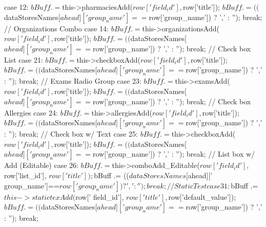 \begin{DoxyCode}
{{{{{{{                                case 12:
                                        $bBuff .= $this->pharmaciesAdd($row['
      field_id'], $row['title']);
                                        $bBuff .= (($dataStoresNames[$ahead]['
      group_name']==$row['group_name']) ? ',' : '');
                                break;
                                // Organizations Combo
                                case 14:
                                        $bBuff .= $this->organizationsAdd($row[
      'field_id'], $row['title']);
                                        $bBuff .= (($dataStoresNames[$ahead]['
      group_name']==$row['group_name']) ? ',' : '');
                                break;
                                // Check box List
                                case 21:
                                        $bBuff .= $this->checkboxAdd($row['
      field_id'], $row['title']);
                                        $bBuff .= (($dataStoresNames[$ahead]['
      group_name']==$row['group_name']) ? ',' : '');
                                break;
                                // Exams Radio Group
                                case 23:
                                        $bBuff .= $this->examsAdd($row['
      field_id'], $row['title']);
                                        $bBuff .= (($dataStoresNames[$ahead]['
      group_name']==$row['group_name']) ? ',' : '');
                                break;
                                // Check box Allergies
                                case 24:
                                        $bBuff .= $this->allergiesAdd($row['
      field_id'], $row['title']);
                                        $bBuff .= (($dataStoresNames[$ahead]['
      group_name']==$row['group_name']) ? ',' : '');
                                break;
                                // Check box w/ Text
                                case 25:
                                        $bBuff .= $this->checkboxAdd($row['
      field_id'], $row['title']);
                                        $bBuff .= (($dataStoresNames[$ahead]['
      group_name']==$row['group_name']) ? ',' : '');
                                break;
                                // List box w/ Add (Editable)
                                case 26:
                                        $bBuff .= $this->comboAdd_Editable($row
      ['field_id'], $row['list_id'], $row['title']);
                                        $bBuff .= (($dataStoresNames[$ahead]['
      group_name']==$row['group_name']) ? ',' : '');
                                break;
                                // Static Test
                                case 31:
                                        $bBuff .= $this->statictexAdd($row['
      field_id'], $row['title'], $row['default_value']);
                                        $bBuff .= (($dataStoresNames[$ahead]['
      group_name']==$row['group_name']) ? ',' : '');
                                break;
                        }
                        
}}}}}}
\end{DoxyCode}
